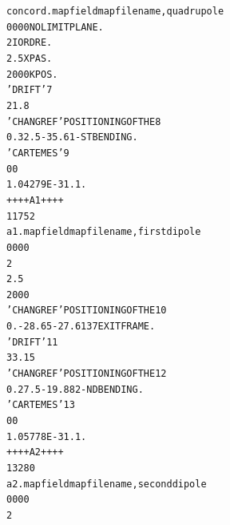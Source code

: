 \begin{tiny}
\begin{center}
\begin{alltt}
  concord.map                         field map file name, quadrupole           
  0  0 0 0                            NO  LIMIT  PLANE.                         
 2                                    IORDRE.                                   
 2.5                                  XPAS.                                     
 2 0 0 0                              KPOS.                                     
 'DRIFT'                                                                      7
 21.8                                                                           
 'CHANGREF'                           POSITIONING  OF  THE                    8
 0. 32.5 -35.6                        1-ST  BENDING.                            
 'CARTEMES'                                                                   9
  0 0                                                                           
  1.04279E-3  1. 1.                                                             
 ++++  A1 ++++                                                                  
  117  52                                                                       
  a1.map                              field map file name, first dipole         
  0  0 0 0                                                                      
 2                                                                              
 2.5                                                                            
 2 0 0 0                                                                        
 'CHANGREF'                           POSITIONING  OF  THE                   10
 0. -28.65  -27.6137                  EXIT  FRAME.                              
 'DRIFT'                                                                     11
 33.15                                                                          
 'CHANGREF'                           POSITIONING  OF  THE                   12
 0. 27.5  -19.88                      2-ND  BENDING.                            
 'CARTEMES'                                                                  13
  0 0                                                                           
  1.05778E-3  1. 1.                                                             
 ++++  A2 ++++                                                                  
  132  80                                                                       
  a2.map                              field map file name, second dipole        
  0  0 0 0                                                                      
 2                                                                              

\end{alltt}
\end{center}
\end{tiny}
